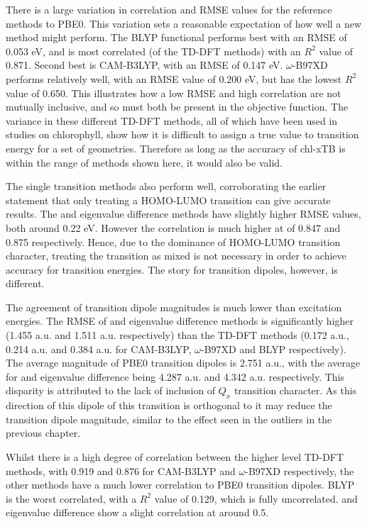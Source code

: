 There is a large variation in correlation and RMSE values for the reference methods
to PBE0. This variation sets a reasonable expectation of how well a new method
might perform.
The BLYP functional performs best with an RMSE of 0.053 eV, and is most correlated
(of the TD-DFT methods) with an $R^2$ value of 0.871. Second best is CAM-B3LYP,
with an RMSE of 0.147 eV. $\omega$-B97XD performs relatively well, with an RMSE
value of 0.200 eV, but has the lowest $R^2$ value of 0.650. This illustrates how
a low RMSE and high correlation are not mutually inclusive, and so must both be 
present in the objective function. 
The variance in these different TD-DFT methods, all of which have been used in studies
on chlorophyll, show how it is difficult to assign a true value to transition energy
for a set of geometries. Therefore as long as the accuracy of chl-xTB is within 
the range of methods shown here, it would also be valid.

The single transition methods also perform well, corroborating the earlier statement
that only treating a HOMO-LUMO transition can give accurate results. The \dscf and
eigenvalue difference methods have slightly higher RMSE values, both around 0.22 eV.
However the correlation is much higher at of 0.847 and 0.875 respectively. Hence,
due to the dominance of HOMO-LUMO transition character, treating the transition
as mixed is not necessary in order to achieve accuracy for transition energies. 
The story for transition dipoles, however, is different.

The agreement of transition dipole magnitudes is much lower than excitation energies.
The RMSE of \dscf and eigenvalue difference methods is significantly higher (1.455
a.u. and 1.511 a.u. respectively) than the TD-DFT methods (0.172 a.u., 0.214 a.u.
and 0.384 a.u. for CAM-B3LYP, $\omega$-B97XD and BLYP respectively). The average
magnitude of PBE0 transition dipoles is 2.751 a.u., with the average for \dscf and 
eigenvalue difference being 4.287 a.u. and 4.342 a.u. respectively. This disparity
is attributed to the lack of inclusion of $Q_x$ transition character. As this direction
of this dipole of this transition is orthogonal to \Qy it may reduce the transition 
dipole magnitude, similar to the effect seen in the outliers in the previous chapter.

Whilst there is a high degree of correlation between the higher level TD-DFT methods,
with 0.919 and 0.876 for CAM-B3LYP and $\omega$-B97XD respectively, the other methods
have a much lower correlation to PBE0 transition dipoles. BLYP is the worst correlated,
with a $R^2$ value of 0.129, which is fully uncorrelated. \dscf and eigenvalue difference
show a slight correlation at around 0.5.

